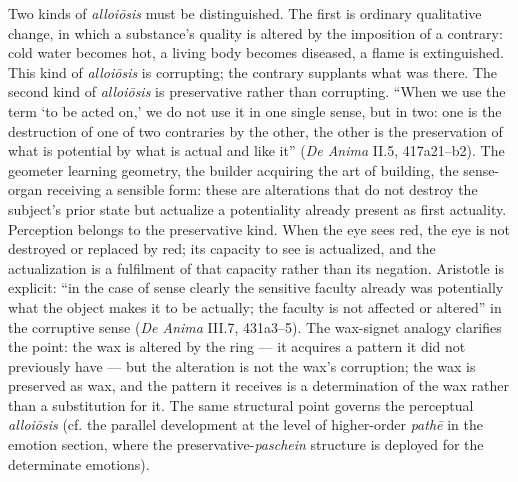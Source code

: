 Two kinds of \textit{alloiōsis} must be distinguished. The first is ordinary qualitative change, in which a substance's quality is altered by the imposition of a contrary: cold water becomes hot, a living body becomes diseased, a flame is extinguished. This kind of \textit{alloiōsis} is corrupting; the contrary supplants what was there. The second kind of \textit{alloiōsis} is preservative rather than corrupting. ``When we use the term `to be acted on,' we do not use it in one single sense, but in two: one is the destruction of one of two contraries by the other, the other is the preservation of what is potential by what is actual and like it'' (\textit{De Anima} II.5, 417a21--b2). The geometer learning geometry, the builder acquiring the art of building, the sense-organ receiving a sensible form: these are alterations that do not destroy the subject's prior state but actualize a potentiality already present as first actuality. Perception belongs to the preservative kind. When the eye sees red, the eye is not destroyed or replaced by red; its capacity to see is actualized, and the actualization is a fulfilment of that capacity rather than its negation. Aristotle is explicit: ``in the case of sense clearly the sensitive faculty already was potentially what the object makes it to be actually; the faculty is not affected or altered'' in the corruptive sense (\textit{De Anima} III.7, 431a3--5). The wax-signet analogy clarifies the point: the wax is altered by the ring --- it acquires a pattern it did not previously have --- but the alteration is not the wax's corruption; the wax is preserved as wax, and the pattern it receives is a determination of the wax rather than a substitution for it. The same structural point governs the perceptual \textit{alloiōsis} (cf. the parallel development at the level of higher-order \textit{pathē} in the emotion section, where the preservative-\textit{paschein} structure is deployed for the determinate emotions).

